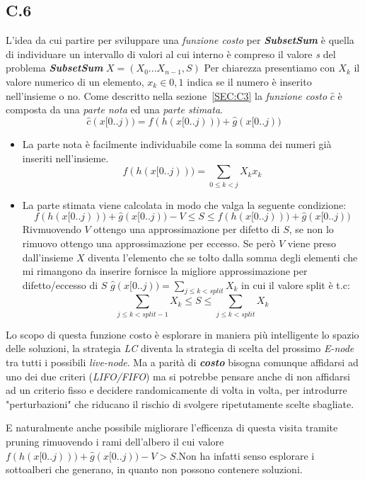 \documentclass[a4paper]{article}
\newcommand{\imp}[1]{\textbf{\textit{#1}}}
\begin{document}
\subsection{C.6}
\label{SEC:C6}
L'idea da cui partire per sviluppare una \textit{funzione costo} per \imp{SubsetSum} è quella di individuare un intervallo di valori al cui interno è compreso il valore \emph{s} del problema \imp{SubsetSum} $X =({X_0 ... X_{n-1}},S)$ 
Per chiarezza presentiamo con $X_k$ il valore numerico di un elemento, $x_k \in {0,1}$ indica se il numero è inserito nell'insieme o no.
Come descritto nella sezione~\ref{SEC:C3} la \textit{funzione costo} $\hat c$ è composta da una \textit{parte nota} ed una \textit{parte stimata}.
$$\hat c(x[0..j)) = f(h(x[0..j))) + \hat g(x[0..j))$$
\begin{itemize}
	\item La parte nota è facilmente individuabile come la somma dei numeri già inseriti nell'insieme.$$ f(h(x[0..j)))=\sum_{0 \leq k < j} X_kx_k$$
	\item La parte stimata viene calcolata in modo che valga la seguente condizione:
		$$ f(h(x[0..j))) + \hat g(x[0..j)) - V \leq S \leq f(h(x[0..j))) + \hat g(x[0..j)) $$
	Rivmuovendo $V$ ottengo una approssimazione per difetto di $S$, se non lo rimuovo ottengo una approssimazione per eccesso.
	Se però $V$ viene preso dall'insieme $X$ diventa l'elemento che se tolto dalla somma degli elementi che mi rimangono da inserire fornisce la migliore approssimazione per difetto/eccesso di $S$
	$ \hat g(x[0..j))=\sum_{j \leq k < split} X_k$ in cui il valore split è t.c:
	$$\sum_{j \leq k < split-1} X_k \leq S \leq \sum_{j \leq k < split} X_k$$
\end{itemize}
Lo scopo di questa funzione costo è esplorare in maniera più intelligente lo spazio delle soluzioni, la strategia \textit{LC} diventa la strategia di scelta del prossimo \textit{E-node} tra tutti i possibili \textit{live-node}.
Ma a parità di \imp{costo} bisogna comunque affidarsi ad uno dei due criteri (\textit{LIFO/FIFO}) ma si potrebbe pensare anche di non affidarsi ad un criterio fisso e decidere randomicamente di volta in volta, per introdurre "perturbazioni" che riducano il rischio di svolgere ripetutamente scelte sbagliate.

E naturalmente anche possibile migliorare l'efficenza di questa visita tramite pruning rimuovendo i rami dell'albero il cui valore $ f(h(x[0..j))) + \hat g(x[0..j)) - V > S$.Non ha infatti senso esplorare i sottoalberi che generano, in quanto non possono contenere soluzioni.
\end{document}
